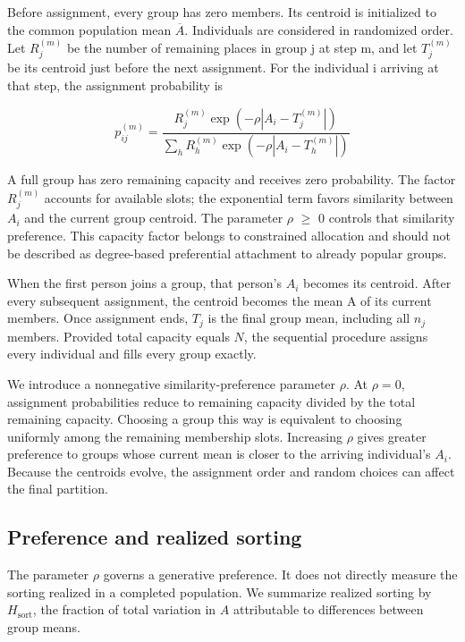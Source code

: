 Before assignment, every group has zero members. Its centroid is initialized to the common population mean \(\overline{A}\). Individuals are considered in randomized order. Let \(R_{j}^{(m)}\) be the number of remaining places in group j at step m, and let \(T_{j}^{(m)}\) be its centroid just before the next assignment. For the individual i arriving at that step, the assignment probability is

\[
p_{ij}^{(m)} = \frac{R_{j}^{(m)}\exp( - \rho|A_{i} - T_{j}^{(m)}|)}{\sum_{h}^{}R_{h}^{(m)}\exp( - \rho|A_{i} - T_{h}^{(m)}|)}
\]

A full group has zero remaining capacity and receives zero probability. The factor \(R_{j}^{(m)}\) accounts for available slots; the exponential term favors similarity between \(A_{i}\) and the current group centroid. The parameter \ensuremath{\rho} \ensuremath{\geq} 0 controls that similarity preference. This capacity factor belongs to constrained allocation and should not be described as degree-based preferential attachment to already popular groups.

When the first person joins a group, that person's \(A_{i}\) becomes its centroid. After every subsequent assignment, the centroid becomes the mean A of its current members. Once assignment ends, \(T_{j}\) is the final group mean, including all \(n_{j}\) members. Provided total capacity equals \(N\), the sequential procedure assigns every individual and fills every group exactly.

We introduce a nonnegative similarity-preference parameter \(\rho\). At \(\rho = 0\), assignment probabilities reduce to remaining capacity divided by the total remaining capacity. Choosing a group this way is equivalent to choosing uniformly among the remaining membership slots. Increasing \(\rho\) gives greater preference to groups whose current mean is closer to the arriving individual's \(A_{i}\). Because the centroids evolve, the assignment order and random choices can affect the final partition.

\subsection{Preference and realized sorting}\label{preference-and-realized-sorting}

The parameter \(\rho\) governs a generative preference. It does not directly measure the sorting realized in a completed population. We summarize realized sorting by \(H_{\mathrm{sort}}\), the fraction of total variation in \(A\) attributable to differences between group means.

